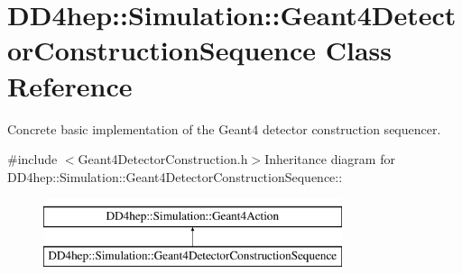 \hypertarget{class_d_d4hep_1_1_simulation_1_1_geant4_detector_construction_sequence}{
\section{DD4hep::Simulation::Geant4DetectorConstructionSequence Class Reference}
\label{class_d_d4hep_1_1_simulation_1_1_geant4_detector_construction_sequence}
}


Concrete basic implementation of the Geant4 detector construction sequencer.  


{\ttfamily \#include $<$Geant4DetectorConstruction.h$>$}Inheritance diagram for DD4hep::Simulation::Geant4DetectorConstructionSequence::\begin{figure}[H]
\begin{center}
\leavevmode
\includegraphics[height=2cm]{class_d_d4hep_1_1_simulation_1_1_geant4_detector_construction_sequence}
\end{center}
\end{figure}
